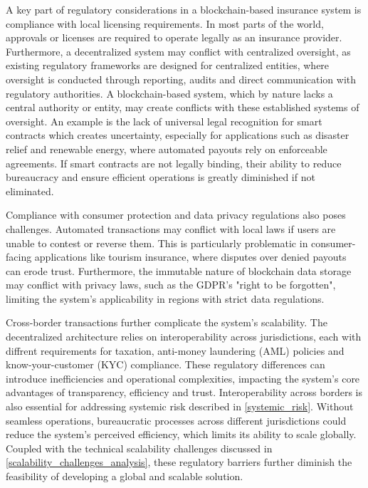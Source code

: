 A key part of regulatory considerations in a blockchain-based insurance system is compliance with local licensing requirements. In most parts of the world, approvals or licenses are required to operate legally as an insurance provider. Furthermore, a decentralized system may conflict with centralized oversight, as existing regulatory frameworks are designed for centralized entities, where oversight is conducted through reporting, audits and direct communication with regulatory authorities. A blockchain-based system, which by nature lacks a central authority or entity, may create conflicts with these established systems of oversight. An example is the lack of universal legal recognition for smart contracts which creates uncertainty, especially for applications such as disaster relief and renewable energy, where automated payouts rely on enforceable agreements. If smart contracts are not legally binding, their ability to reduce bureaucracy and ensure efficient operations is greatly diminished if not eliminated.

Compliance with consumer protection and data privacy regulations also poses challenges. Automated transactions may conflict with local laws if users are unable to contest or reverse them. This is particularly problematic in consumer-facing applications like tourism insurance, where disputes over denied payouts can erode trust. Furthermore, the immutable nature of blockchain data storage may conflict with privacy laws, such as the GDPR's "right to be forgotten", limiting the system's applicability in regions with strict data regulations.

Cross-border transactions further complicate the system's scalability. The decentralized architecture relies on interoperability across jurisdictions, each with diffrent requirements for taxation, anti-money laundering (AML) policies and know-your-customer (KYC) compliance. These regulatory differences can introduce inefficiencies and operational complexities, impacting the system's core advantages of transparency, efficiency and trust. Interoperability across borders is also essential for addressing systemic risk described in \cref{systemic_risk}. Without seamless operations, bureaucratic processes across different jurisdictions could reduce the system's perceived efficiency, which limits its ability to scale globally. Coupled with the technical scalability challenges discussed in \cref{scalability_challenges_analysis}, these regulatory barriers further diminish the feasibility of developing a global and scalable solution.

